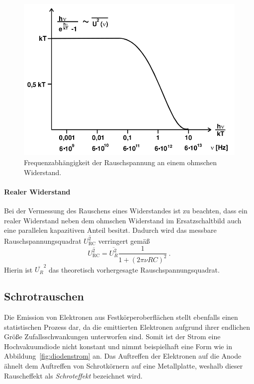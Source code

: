 \begin{figure}[!htpb]
  \centering
  \includegraphics[scale=0.3]{bilder/spannungsquadrat.png}
  \caption{Frequenzabhängigkeit der Rauschspannung an einem ohmschen
    Widerstand.\cite{FP}}
\label{fig:spannungsquadrat}
\end{figure}

\paragraph{Realer Widerstand}
\label{par:realer_widerstand}

Bei der Vermessung des Rauschens eines Widerstandes ist zu beachten, dass ein
realer Widerstand neben dem ohmschen Widerstand im Ersatzschaltbild auch eine
parallelen kapazitiven Anteil besitzt.
Dadurch wird das messbare Rauschspannungsquadrat $\overline{U_\text{RC}^2}$
verringert gemäß
\begin{equation}
  \overline{U_\text{RC}^2} = \overline{U_R^2} \frac{1}{1 + {(2\pi\nu RC)}^2}~.
\end{equation}
Hierin ist $\overline{U_R}^2$ das theoretisch vorhergesagte
Rauschspannungsquadrat.


\subsection{Schrotrauschen}
\label{sub:schrotrauschen}

Die Emission von Elektronen aus Festkörperoberflächen stellt ebenfalls einen
statistischen Prozess dar, da die emittierten Elektronen aufgrund ihrer
endlichen Größe Zufallsschwankungen unterworfen sind.
Somit ist der Strom eine Hochvakuumdiode nicht konstant und nimmt beispielhaft
eine Form wie in Abbildung~\ref{fig:diodenstrom} an.
Das Auftreffen der Elektronen auf die Anode ähnelt dem Auftreffen von
Schrotkörnern auf eine Metallplatte, weshalb dieser Rauscheffekt als
\emph{Schroteffekt} bezeichnet wird.

